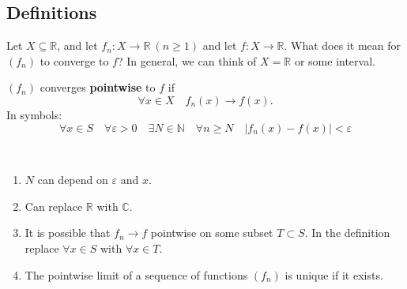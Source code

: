 \documentclass[a4paper,11pt]{article}
\begin{document}
\subsection{Definitions}

Let $X \subseteq \mathbb{R}$, and let $ f_n:X\to \mathbb{R}\ (n\ge 1) $ and let $f:X\to \mathbb{R}$. What does it mean for $ (f_n) $ to converge to $f$? In general, we can think of $X=\mathbb{R}$ or some interval. 

\begin{definition}
    $ (f_n) $ converges \textbf{pointwise} to $f$ if 
    \[
       \forall x\in X\quad f_n(x)\to f(x). 
    \]
    In symbols:
    \[
    \forall x \in S \quad \forall \varepsilon>0 \quad \exists N \in \mathbb{N} \quad \forall n \geqslant N \quad\left|f_{n}(x)-f(x)\right|<\varepsilon
    \]
\end{definition}
\begin{remark}\
    \begin{enumerate}
        \item  $N$ can depend on $\varepsilon$ and $x$.
        \item Can replace $\mathbb{R}$ with $\mathbb{C}$.
        \item It is possible that $f_{n} \rightarrow f$ pointwise on some subset $T \subset S$. In the definition replace $\forall x \in S$ with $\forall x \in T$.
        \item The pointwise limit of a sequence of functions $(f_n)$ is unique if it exists.
    \end{enumerate}
\end{remark}
\end{document}
